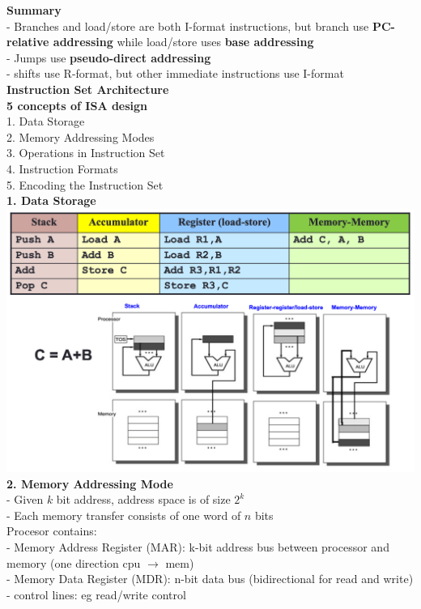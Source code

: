 \documentclass[10pt, a4paper]{article}
\begin{document}
\begin{multicols*}{3}
		\textbf{Summary}\\
		- Branches and load/store are both I-format instructions, but branch use \textbf{PC-relative addressing} while load/store uses \textbf{base addressing}\\
		- Jumps use \textbf{pseudo-direct addressing}\\
		- shifts use R-format, but other immediate instructions use I-format\\
		
		{\normalsize\textbf{Instruction Set Architecture}}\\	
		\textbf{5 concepts of ISA design}\\
		1. Data Storage\\
		2. Memory Addressing Modes\\
		3. Operations in Instruction Set\\
		4. Instruction Formats\\
		5. Encoding the Instruction Set\\
		
		\textbf{1. Data Storage}\\
		\includegraphics[scale=.2]{./assets/dataStorage}\\
		
		\textbf{2. Memory Addressing Mode}\\
		- Given $k$ bit address, address space is of size $2^k$\\
		- Each memory transfer consists of one word of $n$ bits\\
		Procesor contains:\\
		- Memory Address Register (MAR): k-bit address bus between processor and memory (one direction cpu $\rightarrow$ mem)\\
		- Memory Data Register (MDR): n-bit data bus (bidirectional for read and write)\\
		- control lines: eg read/write control\\
		

\end{multicols*}
\end{document}
